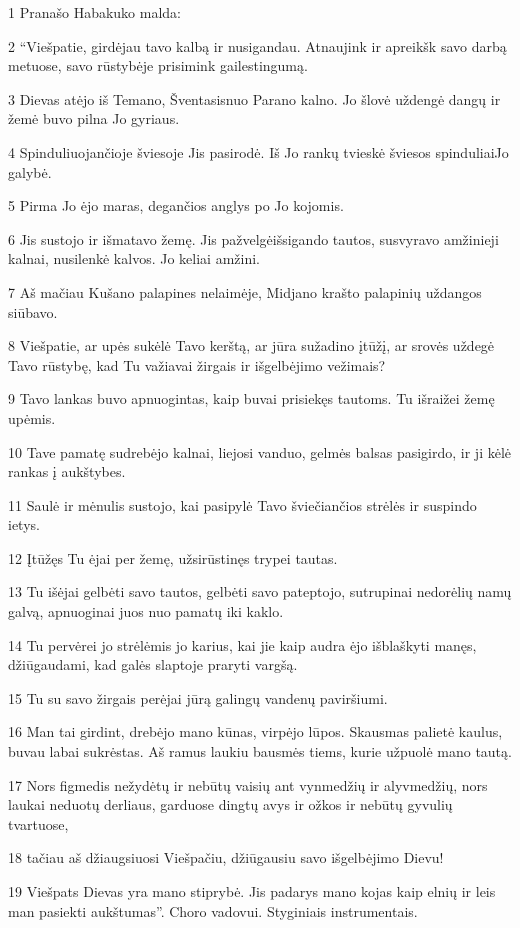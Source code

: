 \par 1 Pranašo Habakuko malda: 
\par 2 “Viešpatie, girdėjau tavo kalbą ir nusigandau. Atnaujink ir apreikšk savo darbą metuose, savo rūstybėje prisimink gailestingumą. 
\par 3 Dievas atėjo iš Temano, Šventasis­nuo Parano kalno. Jo šlovė uždengė dangų ir žemė buvo pilna Jo gyriaus. 
\par 4 Spinduliuojančioje šviesoje Jis pasirodė. Iš Jo rankų tvieskė šviesos spinduliai­Jo galybė. 
\par 5 Pirma Jo ėjo maras, degančios anglys po Jo kojomis. 
\par 6 Jis sustojo ir išmatavo žemę. Jis pažvelgė­išsigando tautos, susvyravo amžinieji kalnai, nusilenkė kalvos. Jo keliai amžini. 
\par 7 Aš mačiau Kušano palapines nelaimėje, Midjano krašto palapinių uždangos siūbavo. 
\par 8 Viešpatie, ar upės sukėlė Tavo kerštą, ar jūra sužadino įtūžį, ar srovės uždegė Tavo rūstybę, kad Tu važiavai žirgais ir išgelbėjimo vežimais? 
\par 9 Tavo lankas buvo apnuogintas, kaip buvai prisiekęs tautoms. Tu išraižei žemę upėmis. 
\par 10 Tave pamatę sudrebėjo kalnai, liejosi vanduo, gelmės balsas pasigirdo, ir ji kėlė rankas į aukštybes. 
\par 11 Saulė ir mėnulis sustojo, kai pasipylė Tavo šviečiančios strėlės ir suspindo ietys. 
\par 12 Įtūžęs Tu ėjai per žemę, užsirūstinęs trypei tautas. 
\par 13 Tu išėjai gelbėti savo tautos, gelbėti savo pateptojo, sutrupinai nedorėlių namų galvą, apnuoginai juos nuo pamatų iki kaklo. 
\par 14 Tu pervėrei jo strėlėmis jo karius, kai jie kaip audra ėjo išblaškyti manęs, džiūgaudami, kad galės slaptoje praryti vargšą. 
\par 15 Tu su savo žirgais perėjai jūrą galingų vandenų paviršiumi. 
\par 16 Man tai girdint, drebėjo mano kūnas, virpėjo lūpos. Skausmas palietė kaulus, buvau labai sukrėstas. Aš ramus laukiu bausmės tiems, kurie užpuolė mano tautą. 
\par 17 Nors figmedis nežydėtų ir nebūtų vaisių ant vynmedžių ir alyvmedžių, nors laukai neduotų derliaus, garduose dingtų avys ir ožkos ir nebūtų gyvulių tvartuose, 
\par 18 tačiau aš džiaugsiuosi Viešpačiu, džiūgausiu savo išgelbėjimo Dievu! 
\par 19 Viešpats Dievas yra mano stiprybė. Jis padarys mano kojas kaip elnių ir leis man pasiekti aukštumas”. Choro vadovui. Styginiais instrumentais.



